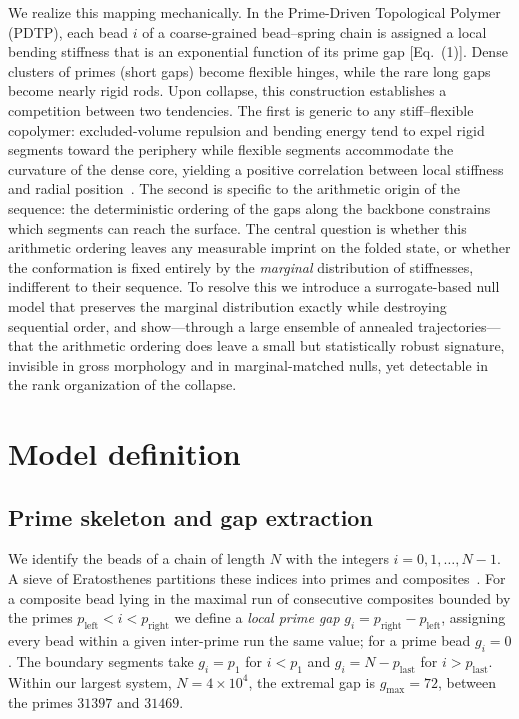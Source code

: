 \documentclass[11pt]{article}
\begin{document}
We realize this mapping mechanically. In the Prime-Driven Topological Polymer
(PDTP), each bead $i$ of a coarse-grained bead--spring chain is assigned a local
bending stiffness that is an exponential function of its prime gap [Eq.~(1)]. Dense
clusters of primes (short gaps) become flexible hinges, while the rare long gaps
become nearly rigid rods. Upon collapse, this construction establishes a
competition between two tendencies. The first is generic to any stiff--flexible
copolymer: excluded-volume repulsion and bending energy tend to expel rigid
segments toward the periphery while flexible segments accommodate the curvature of
the dense core, yielding a positive correlation between local stiffness and radial
position~\cite{KratkyPorod,Montesi}. The second is specific to the arithmetic
origin of the sequence: the deterministic ordering of the gaps along the
backbone constrains which segments can reach the surface. The central question is
whether this arithmetic ordering leaves any measurable imprint on the folded state,
or whether the conformation is fixed entirely by the \emph{marginal} distribution
of stiffnesses, indifferent to their sequence. To resolve this we introduce a
surrogate-based null model that preserves the marginal distribution exactly while
destroying sequential order, and show---through a large ensemble of annealed
trajectories---that the arithmetic ordering does leave a small but statistically
robust signature, invisible in gross morphology and in marginal-matched nulls, yet
detectable in the rank organization of the collapse.

\section{Model definition}

\subsection{Prime skeleton and gap extraction}
We identify the beads of a chain of length $N$ with the integers
$i = 0,1,\dots,N-1$. A sieve of Eratosthenes partitions these indices into primes
and composites~\cite{HardyWright}. For a composite bead lying in the maximal run of
consecutive composites bounded by the primes $p_{\text{left}} < i < p_{\text{right}}$
we define a \emph{local prime gap} $g_i = p_{\text{right}} - p_{\text{left}}$,
assigning every bead within a given inter-prime run the same value; for a prime bead
$g_i = 0$. The boundary segments take $g_i = p_1$ for $i < p_1$ and
$g_i = N - p_{\text{last}}$ for $i > p_{\text{last}}$. Within our largest system,
$N = 4\times10^4$, the extremal gap is $g_{\max} = 72$, between the primes $31397$
and $31469$.
\end{document}
